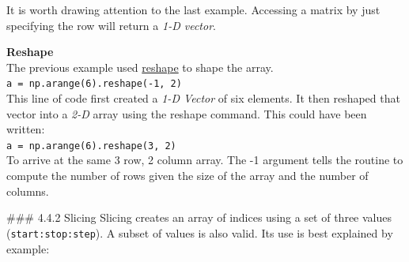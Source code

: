 \documentclass[11pt]{article}
\begin{document}
    It is worth drawing attention to the last example. Accessing a matrix by
just specifying the row will return a \emph{1-D vector}.

    \textbf{Reshape}\\
The previous example used
\href{https://numpy.org/doc/stable/reference/generated/numpy.reshape.html}{reshape}
to shape the array.\\
\texttt{a\ =\ np.arange(6).reshape(-1,\ 2)}~\\
This line of code first created a \emph{1-D Vector} of six elements. It
then reshaped that vector into a \emph{2-D} array using the reshape
command. This could have been written:\\
\texttt{a\ =\ np.arange(6).reshape(3,\ 2)}~\\
To arrive at the same 3 row, 2 column array. The -1 argument tells the
routine to compute the number of rows given the size of the array and
the number of columns.

    \#\#\# 4.4.2 Slicing Slicing creates an array of indices using a set of
three values (\texttt{start:stop:step}). A subset of values is also
valid. Its use is best explained by example:
\end{document}
